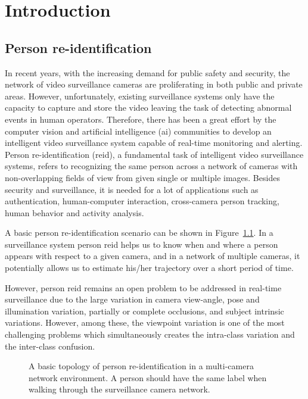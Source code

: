 \chapter{Introduction}\label{intro}
\section{Person re-identification}
In recent years, with the increasing demand for public safety and security, the network of video surveillance cameras are proliferating in both public and private areas. However, unfortunately, existing surveillance systems only have the capacity to capture and store the video leaving the task of detecting abnormal events in human operators. Therefore, there has been a great effort by the computer vision and artificial intelligence (\gls{ai}) communities to develop an intelligent video surveillance system capable of real-time monitoring and alerting. Person re-identification (\gls{reid}), a fundamental task of intelligent video surveillance systems, refers to recognizing the same person across a network of cameras with non-overlapping fields of view from given single or multiple images. Besides security and surveillance, it is needed for a lot of applications such as authentication, human-computer interaction, cross-camera person tracking, human behavior and activity analysis. 

A basic person re-identification scenario can be shown in Figure~\ref{fig:person_reid}. In a surveillance system person \gls{reid} helps us to know when and where a person appears with respect to a given camera, and in a network of multiple cameras, it potentially allows us to estimate his/her trajectory over a short period of time. 

However, person \gls{reid} remains an open problem to be addressed in real-time surveillance due to the large variation in camera view-angle, pose and illumination variation, partially or complete occlusions, and subject intrinsic variations. However, among these, the viewpoint variation is one of the most challenging problems which simultaneously creates the intra-class variation and the inter-class confusion.


\begin{figure}
	\caption[A basic topology of person re-identification in a multi-camera network environment]
	{A basic topology of person re-identification in a multi-camera network environment. A person should have the same label when walking through the surveillance camera network. \label{fig:person_reid}}
\end{figure}


